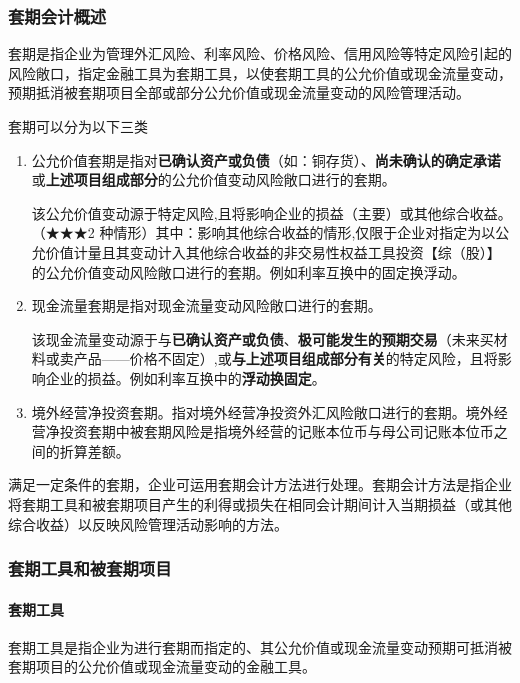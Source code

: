 \documentclass[UTF8,12pt]{ctexart}
\numberwithin{equation}{section} %
\numberwithin{figure}{section}
\numberwithin{table}{section}
\begin{document}
	\subsubsection{套期会计概述}
	套期是指企业为管理外汇风险、利率风险、价格风险、信用风险等特定风险引起的风险敞口，指定金融工具为套期工具，以使套期工具的公允价值或现金流量变动，预期抵消被套期项目全部或部分公允价值或现金流量变动的风险管理活动。
	
	套期可以分为以下三类
	\begin{enumerate}
		\item 公允价值套期是指对\textbf{已确认资产或负债}（如：铜存货）、\textbf{尚未确认的确定承诺}或\textbf{上述项目组成部分}的公允价值变动风险敞口进行的套期。
		
		该公允价值变动源于特定风险,且将影响企业的损益（主要）或其他综合收益。（★★★2 种情形）其中：影响其他综合收益的情形,仅限于企业对指定为以公允价值计量且其变动计入其他综合收益的非交易性权益工具投资【综（股）】的公允价值变动风险敞口进行的套期。例如利率互换中的固定换浮动。
		
		\item 现金流量套期是指对现金流量变动风险敞口进行的套期。
		
		该现金流量变动源于与\textbf{已确认资产或负债}、\textbf{极可能发生的预期交易}（未来买材料或卖产品——价格不固定）,或\textbf{与上述项目组成部分有关}的特定风险，且将影响企业的损益。例如利率互换中的\textbf{浮动换固定}。
		
		\item 境外经营净投资套期。指对境外经营净投资外汇风险敞口进行的套期。境外经营净投资套期中被套期风险是指境外经营的记账本位币与母公司记账本位币之间的折算差额。
	\end{enumerate}

	满足一定条件的套期，企业可运用套期会计方法进行处理。套期会计方法是指企业将套期工具和被套期项目产生的利得或损失在相同会计期间计入当期损益（或其他综合收益）以反映风险管理活动影响的方法。
	
	
	\subsubsection{套期工具和被套期项目}
	\paragraph{套期工具}套期工具是指企业为进行套期而指定的、其公允价值或现金流量变动预期可抵消被套期项目的公允价值或现金流量变动的金融工具。
	
\end{document}
